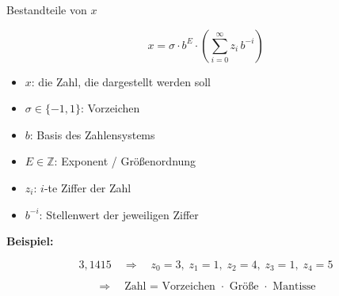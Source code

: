 \documentclass{beamer}
\newcommand{\Z}{\mathbb{Z}}
\begin{document}
\begin{frame}{Bestandteile von \(x\)}

\[
x=\sigma \cdot b^E \cdot \left(\sum_{i=0}^{\infty} z_i\, b^{-i}\right)
\]

\vspace{0.4cm}

\begin{itemize}
    \item \(x\): die Zahl, die dargestellt werden soll
    
    \item \(\sigma \in \{-1,1\}\): Vorzeichen
    
    \item \(b\): Basis des Zahlensystems
    
    \item \(E \in \Z\): Exponent / Größenordnung
    
    \item \(z_i\): \(i\)-te Ziffer der Zahl
    
    \item \(b^{-i}\): Stellenwert der jeweiligen Ziffer
\end{itemize}

\vspace{0.4cm}

\textbf{Beispiel:}

\[
3{,}1415
\quad\Rightarrow\quad
z_0=3,\; z_1=1,\; z_2=4,\; z_3=1,\; z_4=5
\]

\vspace{0.3cm}

\[
\Rightarrow\quad
\text{Zahl = Vorzeichen \(\cdot\) Größe \(\cdot\) Mantisse}
\]

\end{frame}
\end{document}
